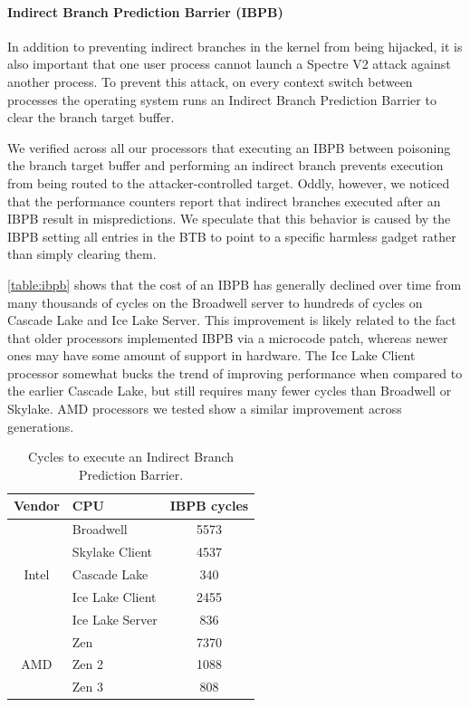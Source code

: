 \paragraph{Indirect Branch Prediction Barrier (IBPB)}

In addition to preventing indirect branches in the kernel from being
hijacked, it is also important that one user process cannot launch a Spectre V2 attack against another process.
To prevent this attack, on every context switch between processes the operating system runs an Indirect Branch Prediction Barrier to clear the branch target buffer.

We verified across all our processors that executing an IBPB between poisoning the branch target buffer and performing an indirect branch prevents execution from being routed to the attacker-controlled target.
Oddly, however, we noticed that the performance counters report that indirect branches executed after an IBPB result in mispredictions.
We speculate that this behavior is caused by the IBPB setting all entries in the BTB to point to a specific harmless gadget rather than simply clearing them.

\autoref{table:ibpb} shows that the cost of an IBPB has generally
declined over time from many thousands of cycles on the Broadwell
server to hundreds of cycles on Cascade Lake and Ice Lake Server.
This improvement is likely related to the fact that older processors implemented IBPB via a microcode patch, whereas newer ones may have some amount of support in hardware.
The Ice Lake Client processor somewhat bucks the trend of improving performance when compared to the earlier Cascade Lake, but still requires many fewer cycles than Broadwell or Skylake.
AMD processors we tested show a similar improvement across generations.

\begin{table}[h]
    \begin{center}
    \begin{tabular}{ clc }
      \textbf{Vendor} & \textbf{CPU} & \textbf{IBPB cycles} \\ \hline

      \multirow{5}{*}{Intel} & Broadwell         & 5573 \\
                             & Skylake Client    & 4537 \\
                             & Cascade Lake      & 340 \\
                             & Ice Lake Client   & 2455 \\
                             & Ice Lake Server   & 836 \\ \hline
      \multirow{3}{*}{AMD}   & Zen               & 7370 \\
                             & Zen 2             & 1088 \\
                             & Zen 3             & 808 \\ \hline
    \end{tabular}
    \end{center}
    \caption{Cycles to execute an Indirect Branch Prediction Barrier. }
    \label{table:ibpb}
\end{table}

